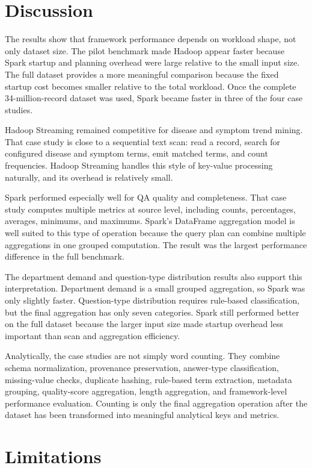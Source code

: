 \documentclass[12pt,a4paper]{article}
\let\oldsection\section
\renewcommand{\section}{\clearpage\oldsection}
\begin{document}
\section{Discussion}

The results show that framework performance depends on workload shape, not only dataset size. The pilot benchmark made Hadoop appear faster because Spark startup and planning overhead were large relative to the small input size. The full dataset provides a more meaningful comparison because the fixed startup cost becomes smaller relative to the total workload. Once the complete 34-million-record dataset was used, Spark became faster in three of the four case studies.

Hadoop Streaming remained competitive for disease and symptom trend mining. That case study is close to a sequential text scan: read a record, search for configured disease and symptom terms, emit matched terms, and count frequencies. Hadoop Streaming handles this style of key-value processing naturally, and its overhead is relatively small.

Spark performed especially well for QA quality and completeness. That case study computes multiple metrics at source level, including counts, percentages, averages, minimums, and maximums. Spark's DataFrame aggregation model is well suited to this type of operation because the query plan can combine multiple aggregations in one grouped computation. The result was the largest performance difference in the full benchmark.

The department demand and question-type distribution results also support this interpretation. Department demand is a small grouped aggregation, so Spark was only slightly faster. Question-type distribution requires rule-based classification, but the final aggregation has only seven categories. Spark still performed better on the full dataset because the larger input size made startup overhead less important than scan and aggregation efficiency.

Analytically, the case studies are not simply word counting. They combine schema normalization, provenance preservation, answer-type classification, missing-value checks, duplicate hashing, rule-based term extraction, metadata grouping, quality-score aggregation, length aggregation, and framework-level performance evaluation. Counting is only the final aggregation operation after the dataset has been transformed into meaningful analytical keys and metrics.

\section{Limitations}
\end{document}
